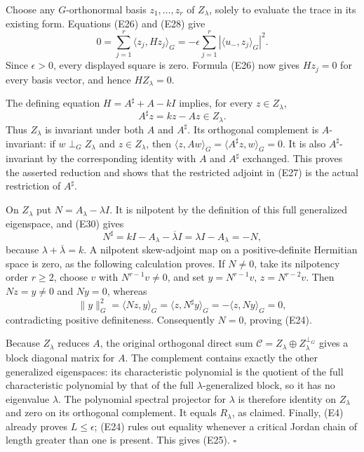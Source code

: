 Choose any \(G\)-orthonormal basis \(z_1,\ldots,z_r\) of \(Z_\lambda\), solely to evaluate the trace in its existing form. Equations (E26) and (E28) give
\[
0=\sum_{j=1}^r\langle z_j,H z_j\rangle_G
=-\epsilon\sum_{j=1}^r|\langle u_-,z_j\rangle_G|^2.
\tag{E29}
\]
Since \(\epsilon>0\), every displayed square is zero. Formula (E26) now gives \(H z_j=0\) for every basis vector, and hence \(H Z_\lambda=0\).

The defining equation \(H=A^\sharp+A-kI\) implies, for every \(z\in Z_\lambda\),
\[
A^\sharp z=kz-Az\in Z_\lambda.
\tag{E30}
\]
Thus \(Z_\lambda\) is invariant under both \(A\) and \(A^\sharp\). Its orthogonal complement is \(A\)-invariant: if \(w\perp_G Z_\lambda\) and \(z\in Z_\lambda\), then
\(\langle z,Aw\rangle_G=\langle A^\sharp z,w\rangle_G=0\).
It is also \(A^\sharp\)-invariant by the corresponding identity with \(A\) and \(A^\sharp\) exchanged. This proves the asserted reduction and shows that the restricted adjoint in (E27) is the actual restriction of \(A^\sharp\).

On \(Z_\lambda\) put \(N=A_\lambda-\lambda I\). It is nilpotent by the definition of this full generalized eigenspace, and (E30) gives
\[
N^\sharp=kI-A_\lambda-\overline\lambda I
=\lambda I-A_\lambda=-N,
\tag{E31}
\]
because \(\lambda+\overline\lambda=k\). A nilpotent skew-adjoint map on a positive-definite Hermitian space is zero, as the following calculation proves. If \(N\ne0\), take its nilpotency order \(r\geq2\), choose \(v\) with \(N^{r-1}v\ne0\), and set \(y=N^{r-1}v\), \(z=N^{r-2}v\). Then \(Nz=y\ne0\) and \(Ny=0\), whereas
\[
\|y\|_G^2=\langle Nz,y\rangle_G
=\langle z,N^\sharp y\rangle_G
=-\langle z,Ny\rangle_G=0,
\tag{E32}
\]
contradicting positive definiteness. Consequently \(N=0\), proving (E24).

Because \(Z_\lambda\) reduces \(A\), the original orthogonal direct sum \(\mathcal C=Z_\lambda\oplus Z_\lambda^{\perp_G}\) gives a block diagonal matrix for \(A\). The complement contains exactly the other generalized eigenspaces: its characteristic polynomial is the quotient of the full characteristic polynomial by that of the full \(\lambda\)-generalized block, so it has no eigenvalue \(\lambda\). The polynomial spectral projector for \(\lambda\) is therefore identity on \(Z_\lambda\) and zero on its orthogonal complement. It equals \(R_\lambda\), as claimed. Finally, (E4) already proves \(L\leq\epsilon\); (E24) rules out equality whenever a critical Jordan chain of length greater than one is present. This gives (E25). \(\square\)

